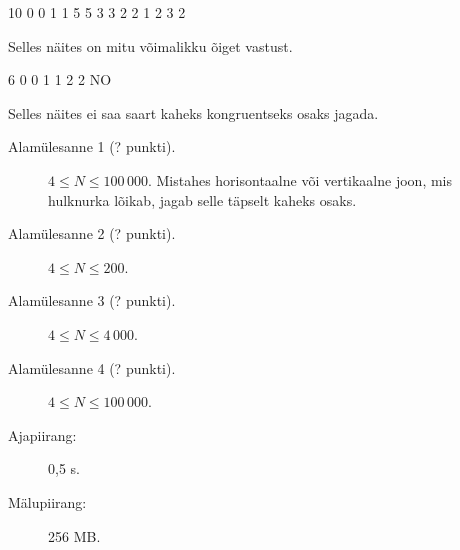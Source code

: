 \documentclass{boi2014-et}
\begin{document}
\clearpage

    \Examples

    \example
    {
        10  0  0  1  1  5  5  3  3  2  2
    }
    {
        1 2 3 2
    }
    {
        Selles näites on mitu võimalikku õiget vastust.

        \begin{center}
        \end{center}
    }

    \example
    {
        6  0  0  1  1  2  2
    }
    {
        NO
    }
    {
        Selles näites ei saa saart kaheks kongruentseks osaks jagada.

        \begin{center}
        \end{center}
    }

    \Scoring

    \begin{description}
        \item[Alamülesanne 1 (? punkti).] $4 \le N \le 100\,000$.
            Mistahes horisontaalne või vertikaalne joon, mis hulknurka lõikab,
            jagab selle täpselt kaheks osaks.
        \item[Alamülesanne 2 (? punkti).] $4 \le N \le 200$.
        \item[Alamülesanne 3 (? punkti).] $4 \le N \le 4\,000$.
        \item[Alamülesanne 4 (? punkti).] $4 \le N \le 100\,000$.
    \end{description}

    \Constraints

    \begin{description}
        \item[Ajapiirang:] 0,5 s.
        \item[Mälupiirang:] 256 MB.
    \end{description}
\end{document}
